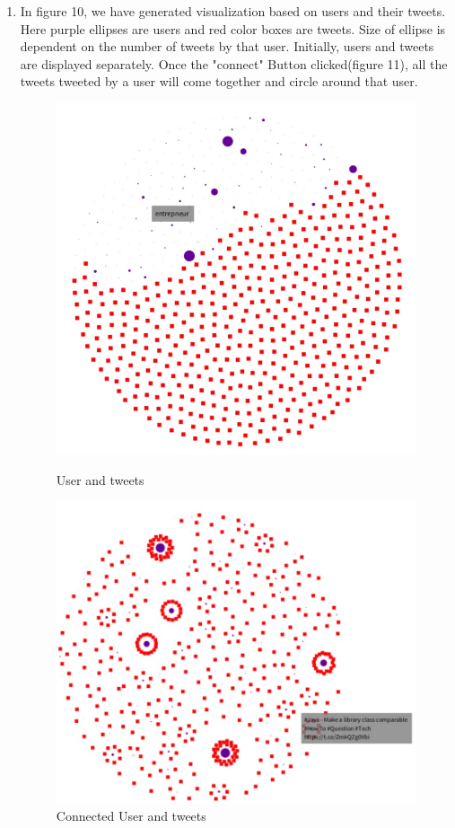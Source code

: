\documentclass[11pt]{article}
\begin{document}
\begin{enumerate}
\item In figure 10, we have generated visualization based on users and their tweets. Here purple ellipses are users and red color boxes are tweets. Size of ellipse is dependent on the number of tweets by that user. Initially, users and tweets are displayed separately. Once the "connect" Button clicked(figure 11), all the tweets tweeted by a user will come together and circle around that user.
\begin{figure}
\centering
\begin{minipage}{.5\textwidth}
\centering
\includegraphics[width=.6\linewidth]{UserTweet1.jpg}
  \caption{User and tweets}
\end{minipage}%
\begin{minipage}{.5\textwidth}
\centering
\includegraphics[width=.6\linewidth]{UserTweet2.jpg}
  \caption{Connected User and tweets}
\end{minipage}
\end{figure}


\end{enumerate}
\end{document}
